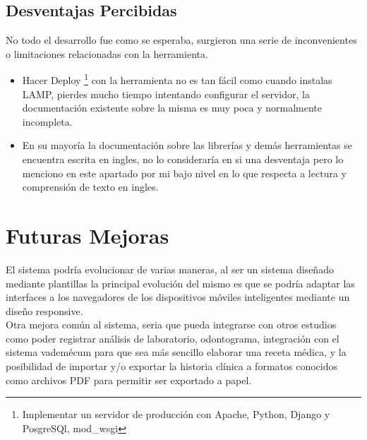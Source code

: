 \subsection{Desventajas Percibidas}

No todo el desarrollo fue como se esperaba, surgieron una serie de inconvenientes o limitaciones relacionadas con la herramienta.

\begin{itemize}
    \item Hacer Deploy \footnote{Implementar un servidor de producción con Apache, Python, Django y PosgreSQl, mod\_wsgi} con la herramienta no es tan fácil como cuando instalas LAMP, pierdes mucho tiempo intentando configurar el servidor, la documentación existente sobre la misma es muy poca y normalmente incompleta.

    \item En su mayoría la documentación sobre las librerías y demás herramientas se encuentra escrita en ingles, no lo consideraría en si una desventaja pero lo menciono en este apartado por mi bajo nivel en lo que respecta a lectura y comprensión de texto en ingles.
\end{itemize}


\section{Futuras Mejoras}

El sistema podría evolucionar de varias maneras, al ser un sistema diseñado mediante plantillas la principal evolución del mismo es que se podría adaptar las interfaces a los navegadores de los dispositivos móviles inteligentes mediante un diseño responsive. \\[0.1cm]

Otra mejora común al sistema, seria que pueda integrarse con otros estudios como poder registrar análisis de laboratorio, odontograma, integración con  el sistema vademécum para que sea más sencillo elaborar una receta médica,  y la posibilidad de importar y/o exportar la historia clínica a formatos conocidos como archivos PDF para permitir ser exportado a papel.

